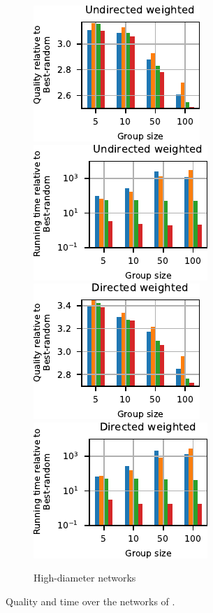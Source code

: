 \begin{figure}[tb]
\begin{subfigure}[t]{\textwidth}
\includegraphics[width=.24\textwidth]{./sources/plots/gh-gc-apx/quality-high-diameter-undirected-weighted.pdf}
\includegraphics[width=.24\textwidth]{./sources/plots/gh-gc-apx/time-high-diameter-undirected-weighted.pdf}
\includegraphics[width=.24\textwidth]{./sources/plots/gh-gc-apx/quality-high-diameter-directed-weighted.pdf}
\includegraphics[width=.24\textwidth]{./sources/plots/gh-gc-apx/time-high-diameter-directed-weighted.pdf}
\caption{High-diameter networks}
\label{fig:gh-gc-apx:qual-time-gc-high-diam}
\end{subfigure}\medskip
\caption{Quality and time \wrt \bestrandomc over the networks of .}
\label{fig:gh-gc-apx:qual-time-gc}
\end{figure}

